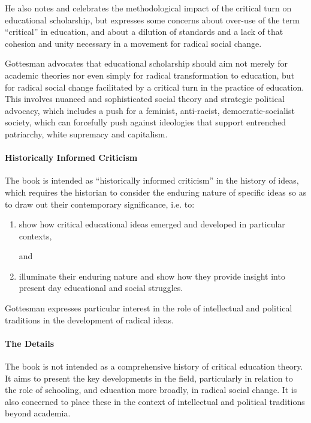 \documentclass[10pt,titlepage]{book}
\begin{document}
He also notes and celebrates the methodological impact of the critical turn on educational scholarship, but expresses some concerns about over-use of the term ``critical'' in education, and about a dilution of standards and a lack of that cohesion and unity necessary in a movement for radical social change.

Gottesman advocates that educational scholarship should aim not merely for academic theories nor even simply for radical transformation to education, but for radical social change facilitated by a critical turn in the practice of education.
This involves nuanced and sophisticated social theory and strategic political advocacy,  which includes a push for a feminist, anti-racist, democratic-socialist society, which can forcefully push against ideologies that support entrenched patriarchy, white supremacy and capitalism.

\paragraph{Historically Informed Criticism}

The book is intended as ``historically informed criticism'' in the history of ideas, which requires the historian to consider the enduring nature of specific ideas so as to draw out their contemporary significance, i.e. to:

\begin{enumerate}
\item show how critical educational ideas emerged and developed in particular contexts,

  and
  
\item illuminate their enduring nature and show how they provide insight into present day educational and social struggles.
  
\end{enumerate}

Gottesman expresses particular interest in the role of intellectual and political traditions in the development of radical ideas.

\paragraph{The Details}

The book is not intended as a comprehensive history of critical education theory.
It aims to present the key developments in the field, particularly in relation to the role of schooling, and education more broadly, in radical social change.
It is also concerned to place these in the context of intellectual and political traditions beyond academia.
\end{document}

